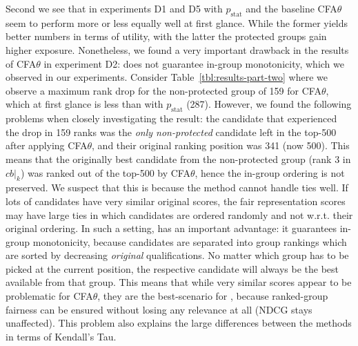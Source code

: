 Second we see that in experiments D1 and D5 \algoFAIR with $p_{\text{stat}}$ and the baseline CFA$\theta$ seem to perform more or less equally well at first glance.
%
While the former yields better numbers in terms of utility, with the latter the protected groups gain higher exposure.
%
Nonetheless, we found a very important drawback in the results of CFA$\theta$ in experiment D2: \citet{zehlike2020matching} does not guarantee in-group monotonicity, which we observed in our experiments.
%
Consider Table~\ref{tbl:results-part-two} where we observe a maximum rank drop for the non-protected group of 159 for CFA$\theta$, which at first glance is less than \algoFAIR with $p_{\text{stat}}$ (287).
%
However, we found the following problems when closely investigating the result: the candidate that experienced the drop in 159 ranks was the \emph{only non-protected} candidate left in the top-500 after applying CFA$\theta$, and their original ranking position was 341 (now 500).
%
This means that the originally best candidate from the non-protected group (rank 3 in $cb|_k$) was ranked out of the top-500 by CFA$\theta$, hence the in-group ordering is not preserved.
%
We suspect that this is because the method cannot handle ties well.  %
%
If lots of candidates have very similar original scores, the fair representation scores may have large ties in which candidates are ordered randomly and not w.r.t. their original ordering.
%
In such a setting, \algoFAIR has an important advantage: it guarantees in-group monotonicity, because candidates are separated into group rankings which are sorted by decreasing \emph{original} qualifications.
%
No matter which group has to be picked at the current position, the respective candidate will always be the best available from that group.
%
This means that while very similar scores appear to be problematic for CFA$\theta$, they are the best-scenario for \algoFAIR, because ranked-group fairness can be ensured without losing any relevance at all (NDCG stays unaffected).
%
This problem also explains the large differences between the methods in terms of Kendall's Tau.


